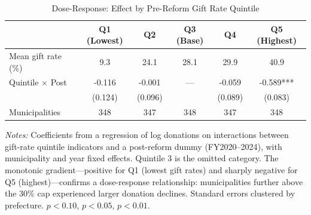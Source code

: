 \begin{table}[htbp]
\centering
\caption{Dose-Response: Effect by Pre-Reform Gift Rate Quintile}
\label{tab:quintile}
\begin{tabular}{lccccc}
\hline\hline
 & Q1 (Lowest) & Q2 & Q3 (Base) & Q4 & Q5 (Highest) \\
\hline
Mean gift rate (\%) & 9.3 & 24.1 & 28.1 & 29.9 & 40.9 \\
[0.5em]
Quintile $\times$ Post & -0.116 & -0.001 & --- & -0.059 & -0.589*** \\
 & (0.124) & (0.096) &  & (0.089) & (0.083) \\
\hline
Municipalities & 348 & 347 & 348 & 347 & 348 \\
\hline\hline
\end{tabular}
\begin{tablenotes}[flushleft]
\small
\item \textit{Notes:} Coefficients from a regression of log donations on interactions between gift-rate quintile indicators and a post-reform dummy (FY2020--2024), with municipality and year fixed effects. Quintile 3 is the omitted category. The monotonic gradient---positive for Q1 (lowest gift rates) and sharply negative for Q5 (highest)---confirms a dose-response relationship: municipalities further above the 30\% cap experienced larger donation declines. Standard errors clustered by prefecture. \sym{*} $p < 0.10$, \sym{**} $p < 0.05$, \sym{***} $p < 0.01$.
\end{tablenotes}
\end{table}

